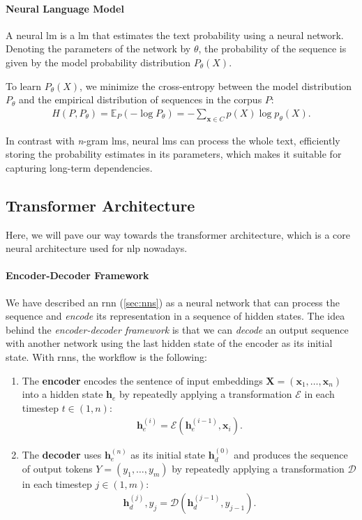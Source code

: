 \paragraph{Neural Language Model} A neural \ac{lm} is a \acl{lm} that estimates the text probability using a neural network. Denoting the parameters of the network by $\theta$, the probability of the sequence is given by the model probability distribution $P_\theta(X)$.

To learn $P_\theta(X)$, we minimize the cross-entropy between the model distribution $P_\theta$ and the empirical distribution of sequences in the corpus $P$:
\begin{align}
    H(P,P_\theta) = \mathbb{E}_P(-\log P_\theta) = -\sum_{\mathbf{x}\in C}p(X)\log p_{\theta}(X).
\end{align}

In contrast with \emph{n}-gram \acp{lm}, neural \acp{lm} can process the whole text, efficiently storing the probability estimates in its parameters, which makes it suitable for capturing long-term dependencies.

\subsection{Transformer Architecture}
\label{sec:transformer}
Here, we will pave our way towards the transformer architecture, which is a core neural architecture used for \ac{nlp} nowadays.

\paragraph{Encoder-Decoder Framework}
We have described an \ac{rnn} (\autoref{sec:nns}) as a neural network that can process the sequence and \emph{encode} its representation in a sequence of hidden states. The idea behind the \emph{encoder-decoder framework} \cite{sutskever2014sequence,cho2014learning} is that we can \emph{decode} an output sequence with another network using the last hidden state of the encoder as its initial state. With \acp{rnn}, the workflow is the following:

\begin{enumerate}
    \item The \textbf{encoder} encodes the sentence of input embeddings $\mathbf{X}= (\mathbf{x}_1, \ldots, \mathbf{x}_n)$ into a hidden state $\mathbf{h}_e$ by repeatedly applying a transformation $\mathcal{E}$ in each timestep $t\in(1,n)$:
          \begin{align}
              \mathbf{h}_e^{(i)} = \mathcal{E}(\mathbf{h}_e^{(i-1)}, \mathbf{x}_i).
          \end{align}
    \item The \textbf{decoder} uses $\mathbf{h}_e^{(n)}$ as its initial state $\mathbf{h}_d^{(0)}$ and produces the sequence of output tokens  $Y = (y_1, \ldots, y_m)$ by repeatedly applying a transformation $\mathcal{D}$ in each timestep $j\in(1,m)$:
          \begin{align}
              \mathbf{h}_d^{(j)}, y_j = \mathcal{D}(\mathbf{h}_d^{(j-1)}, y_{j-1}).
          \end{align}
\end{enumerate}


